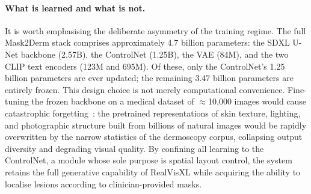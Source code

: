 \paragraph{What is learned and what is not.}
It is worth emphasising the deliberate asymmetry of the training regime. The full Mask2Derm stack comprises approximately 4.7 billion parameters: the SDXL U-Net backbone (2.57B), the ControlNet (1.25B), the VAE (84M), and the two CLIP text encoders (123M and 695M). Of these, only the ControlNet's 1.25 billion parameters are ever updated; the remaining 3.47 billion parameters are entirely frozen. This design choice is not merely computational convenience. Fine-tuning the frozen backbone on a medical dataset of $\approx$10{,}000 images would cause catastrophic forgetting~\cite{mccloskey1989catastrophic}: the pretrained representations of skin texture, lighting, and photographic structure built from billions of natural images would be rapidly overwritten by the narrow statistics of the dermoscopy corpus, collapsing output diversity and degrading visual quality. By confining all learning to the ControlNet, a module whose sole purpose is spatial layout control, the system retains the full generative capability of RealVisXL while acquiring the ability to localise lesions according to clinician-provided masks.

